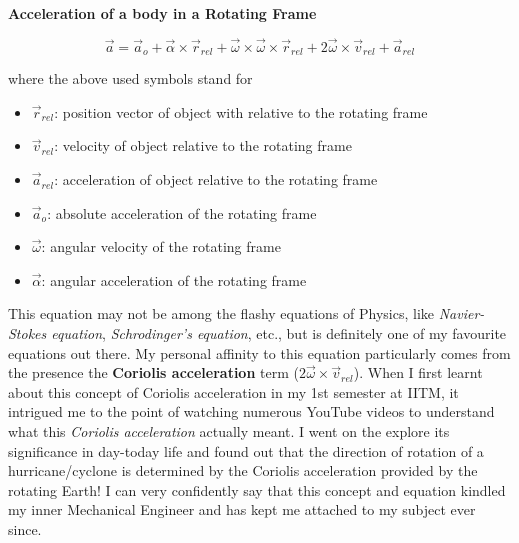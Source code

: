 \begin{center}
    \textbf{Acceleration of a body in a Rotating Frame}
\end{center}
$$ \vec{a} = \vec{a}_o + \vec{\alpha} \times \vec{r}_{rel} + \vec{\omega} \times \vec{\omega} \times \vec{r}_{rel} + 2 \vec{\omega} \times \vec{v}_{rel} + \vec{a}_{rel} $$

where the above used symbols stand for
\begin{itemize}
    \item $ \vec{r}_{rel} $: position vector of object with relative to the rotating frame
    \item $ \vec{v}_{rel} $: velocity of object relative to the rotating frame
    \item $ \vec{a}_{rel} $: acceleration of object relative to the rotating frame
    \item $ \vec{a}_o $: absolute acceleration of the rotating frame
    \item $ \vec{\omega} $: angular velocity of the rotating frame
    \item $ \vec{\alpha} $: angular acceleration of the rotating frame
\end{itemize}

This equation may not be among the flashy equations of Physics, like \textit{Navier-Stokes equation}, \textit{Schrodinger's equation}, etc., but is definitely one of my favourite equations out there. My personal affinity to this equation particularly comes from the presence the \textbf{Coriolis acceleration} term ($ 2 \vec{\omega} \times \vec{v}_{rel} $). When I first learnt about this concept of Coriolis acceleration in my 1st semester at IITM, it intrigued me to the point of watching numerous YouTube videos to understand what this \textit{Coriolis acceleration} actually meant. I went on the explore its significance in day-today life and found out that the direction of rotation of a hurricane/cyclone is determined by the Coriolis acceleration provided by the rotating Earth! I can very confidently say that this concept and equation kindled my inner Mechanical Engineer and has kept me attached to my subject ever since.

